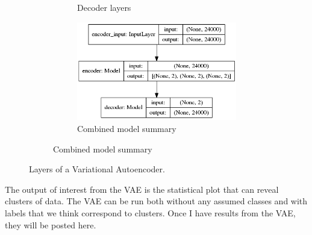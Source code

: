 \documentclass[a4paper]{article}
\begin{document}
\begin{figure}[h!]
\begin{subfigure}{.49\textwidth}
\begin{subfigure}{.6\textwidth}
			\caption{Decoder layers}
			\label{fig:vae_decoder}
		\end{subfigure}
		\vspace{10mm}%
		\begin{subfigure}{.8\textwidth}
			\centering
			\includegraphics[width=1\linewidth]{vae_mlp}
			\caption{Combined model summary}
			\label{fig:vae_mlp}
		\end{subfigure}
		\label{fig:decoder}
	\end{subfigure}
	
	\caption{Layers of a Variational Autoencoder.}
	\label{fig:vae}
\end{figure} 

The output of interest from the VAE is the statistical plot that can reveal clusters of data. The VAE can be run both without any assumed classes and with labels that we think correspond to clusters. Once I have results from the VAE, they will be posted here.




\end{document}
